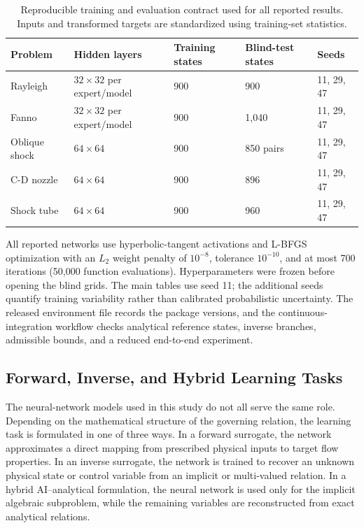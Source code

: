 \documentclass[preprint,12pt]{elsarticle}
\newenvironment{revision}{}{}
\newenvironment{revision}{\color{revisionblue}}{}
\begin{document}
\begin{revision}
\begin{table}[t]
\centering
\caption{Reproducible training and evaluation contract used for all reported results. Inputs and transformed targets are standardized using training-set statistics.}
\label{tab:training_contract}
\small
\renewcommand{\arraystretch}{1.15}
\begin{tabular}{p{2.4cm} p{2.2cm} p{2.1cm} p{2.5cm} p{2.0cm}}
\toprule
\textbf{Problem} & \textbf{Hidden layers} & \textbf{Training states} & \textbf{Blind-test states} & \textbf{Seeds} \\
\midrule
Rayleigh & $32\times32$ per expert/model & 900 & 900 & 11, 29, 47 \\
Fanno & $32\times32$ per expert/model & 900 & 1,040 & 11, 29, 47 \\
Oblique shock & $64\times64$ & 900 & 850 pairs & 11, 29, 47 \\
C-D nozzle & $64\times64$ & 900 & 896 & 11, 29, 47 \\
Shock tube & $64\times64$ & 900 & 960 & 11, 29, 47 \\
\bottomrule
\end{tabular}
\end{table}

All reported networks use hyperbolic-tangent activations and L-BFGS optimization with an $L_2$ weight penalty of $10^{-8}$, tolerance $10^{-10}$, and at most 700 iterations (50,000 function evaluations). Hyperparameters were frozen before opening the blind grids. The main tables use seed 11; the additional seeds quantify training variability rather than calibrated probabilistic uncertainty. The released environment file records the package versions, and the continuous-integration workflow checks analytical reference states, inverse branches, admissible bounds, and a reduced end-to-end experiment.
\end{revision}

\subsection{Forward, Inverse, and Hybrid Learning Tasks}

The neural-network models used in this study do not all serve the same role. Depending on the mathematical structure of the governing relation, the learning task is formulated in one of three ways. In a forward surrogate, the network approximates a direct mapping from prescribed physical inputs to target flow properties. In an inverse surrogate, the network is trained to recover an unknown physical state or control variable from an implicit or multi-valued relation. In a hybrid AI--analytical formulation, the neural network is used only for the implicit algebraic subproblem, while the remaining variables are reconstructed from exact analytical relations.
\end{document}
